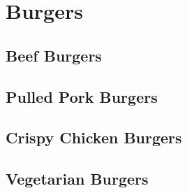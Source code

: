\chapter{Burgers}
\section{Beef Burgers}
\section{Pulled Pork Burgers}
\section{Crispy Chicken Burgers}
\section{Vegetarian Burgers}
